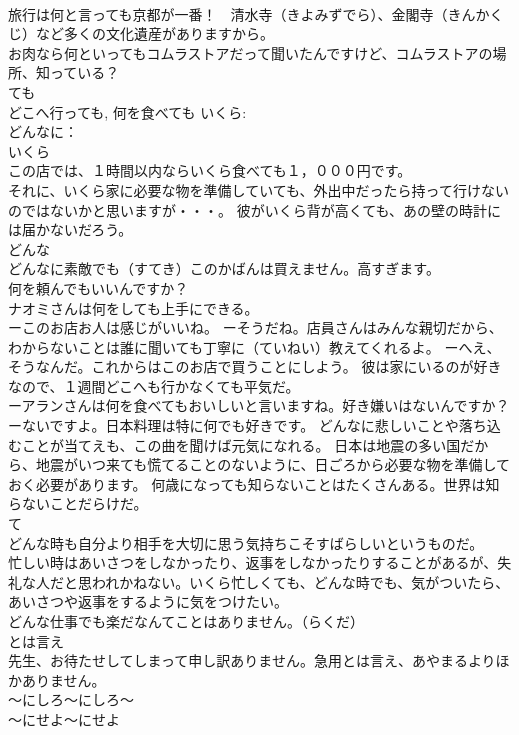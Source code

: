\documentclass[8pt]{extreport}
\begin{document}
\begin{CJK}{UTF8}{min}
\\	旅行は何と言っても京都が一番！　清水寺（きよみずでら）、金閣寺（きんかくじ）など多くの文化遺産がありますから。 
\\	お肉なら何といってもコムラストアだって聞いたんですけど、コムラストアの場所、知っている？ 
\\	ても 
\\	どこへ行っても, 何を食べても いくら: 
\\	どんなに： 
\\	いくら 
\\	この店では、１時間以内ならいくら食べても１，０００円です。 
\\	それに、いくら家に必要な物を準備していても、外出中だったら持って行けないのではないかと思いますが・・・。 彼がいくら背が高くても、あの壁の時計には届かないだろう。 
\\	どんな 
\\	どんなに素敵でも（すてき）このかばんは買えません。高すぎます。 
\\	何を頼んでもいいんですか？ 
\\	ナオミさんは何をしても上手にできる。 
\\	ーこのお店お人は感じがいいね。 ーそうだね。店員さんはみんな親切だから、わからないことは誰に聞いても丁寧に（ていねい）教えてくれるよ。 ーへえ、そうなんだ。これからはこのお店で買うことにしよう。 彼は家にいるのが好きなので、１週間どこへも行かなくても平気だ。 
\\	ーアランさんは何を食べてもおいしいと言いますね。好き嫌いはないんですか？ ーないですよ。日本料理は特に何でも好きです。 どんなに悲しいことや落ち込むことが当てえも、この曲を聞けば元気になれる。 日本は地震の多い国だから、地震がいつ来ても慌てることのないように、日ごろから必要な物を準備しておく必要があります。 何歳になっても知らないことはたくさんある。世界は知らないことだらけだ。 
\\	て 
\\	どんな時も自分より相手を大切に思う気持ちこそすばらしいというものだ。 
\\	忙しい時はあいさつをしなかったり、返事をしなかったりすることがあるが、失礼な人だと思われかねない。いくら忙しくても、どんな時でも、気がついたら、あいさつや返事をするように気をつけたい。 
\\	どんな仕事でも楽だなんてことはありません。（らくだ） 
\\	とは言え 
\\	先生、お待たせしてしまって申し訳ありません。急用とは言え、あやまるよりほかありません。　
\\	～にしろ～にしろ～ 
\\	～にせよ～にせよ 

\end{CJK}
\end{document}
